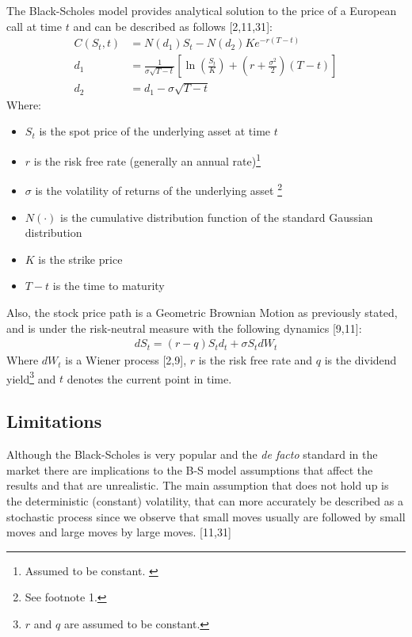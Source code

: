 \documentclass[12pt,twoside]{reedthesis}
\providecommand{\tightlist}{%
  \setlength{\itemsep}{0pt}\setlength{\parskip}{0pt}}
\theoremstyle{definition}
\theoremstyle{definition}
\theoremstyle{remark}
\begin{document}
  The Black-Scholes model provides analytical solution to the price of a
  European call at time \(t\) and can be described as follows
  {[}2,11,31{]}:
  \begin{align}
  C(S_{t},t)&=N(d_{1})S_{t}-N(d_{2})Ke^{-r(T-t)}\\[10pt]
  d_{1}&={\frac {1}{\sigma {\sqrt {T-t}}}}\left[\ln \left({\frac {S_{t}}{K}}\right)+\left(r+{\frac {\sigma ^{2}}{2}}\right)(T-t)\right]\\[10pt]
  d_{2}&=d_{1}-\sigma {\sqrt {T-t}}
  \end{align}
  \noindent
  Where:
  \begin{itemize}
  \tightlist
  \item
    \(S_{t}\) is the spot price of the underlying asset at time \(t\)
  \item
    \(r\) is the risk free rate (generally an annual
    rate)\footnote{Assumed to be constant. \label{teste}}
  \item
    \(\sigma\) is the volatility of returns of the underlying asset
    \footnote{See footnote 1.}
  \item
    \(N(\cdot )\) is the cumulative distribution function of the standard
    Gaussian distribution
  \item
    \(K\) is the strike price
  \item
    \(T-t\) is the time to maturity
  \end{itemize}
  \noindent
  Also, the stock price path is a Geometric Brownian Motion as previously
  stated, and is under the risk-neutral measure with the following
  dynamics {[}9,11{]}:
  \begin{align}
  dS_{t} = (r-q)S_td_t+\sigma S_t dW_t
  \end{align}
  \noindent
  Where \(dW_t\) is a Wiener process {[}2,9{]}, \(r\) is the risk free
  rate and \(q\) is the dividend
  yield\footnote{$r$ and $q$ are assumed to be constant.} and \(t\)
  denotes the current point in time.
  
  \subsection{Limitations}\label{limitations}
  
  Although the Black-Scholes is very popular and the \emph{de facto}
  standard in the market there are implications to the B-S model
  assumptions that affect the results and that are unrealistic. The main
  assumption that does not hold up is the deterministic (constant)
  volatility, that can more accurately be described as a stochastic
  process since we observe that small moves usually are followed by small
  moves and large moves by large moves. {[}11,31{]}
  
\end{document}
